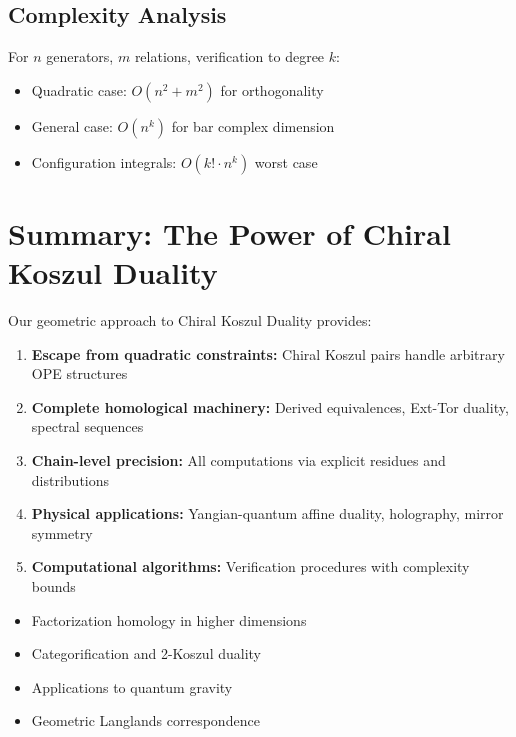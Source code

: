 \subsection{Complexity Analysis}

For $n$ generators, $m$ relations, verification to degree $k$:
\begin{itemize}
\item Quadratic case: $O(n^2 + m^2)$ for orthogonality
\item General case: $O(n^k)$ for bar complex dimension
\item Configuration integrals: $O(k! \cdot n^k)$ worst case
\end{itemize}


\section{Summary: The Power of Chiral Koszul Duality}

Our geometric approach to Chiral Koszul Duality provides:

\begin{enumerate}
\item \textbf{Escape from quadratic constraints:} Chiral Koszul pairs handle arbitrary OPE structures

\item \textbf{Complete homological machinery:} Derived equivalences, Ext-Tor duality, spectral sequences

\item \textbf{Chain-level precision:} All computations via explicit residues and distributions

\item \textbf{Physical applications:} Yangian-quantum affine duality, holography, mirror symmetry

\item \textbf{Computational algorithms:} Verification procedures with complexity bounds
\end{enumerate}

\begin{remark}
\begin{itemize}
\item Factorization homology in higher dimensions
\item Categorification and 2-Koszul duality
\item Applications to quantum gravity
\item Geometric Langlands correspondence
\end{itemize}
\end{remark}